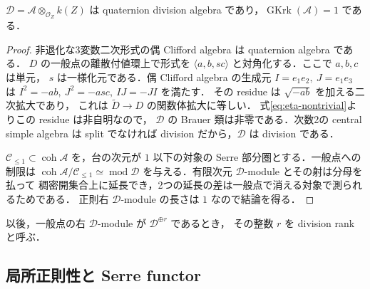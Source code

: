 \begin{proposition}
\label{prop:division}
$\mathscr D=\mathcal A\otimes_{\mathcal O_Z}k(Z)$ は quaternion division algebra
であり，$\operatorname{GKrk}(\mathcal A)=1$ である．
\end{proposition}
\begin{proof}
非退化な3変数二次形式の偶 Clifford algebra は quaternion algebra である．
$D$ の一般点の離散付値環上で形式を
$\langle a,b,sc\rangle$ と対角化する．ここで $a,b,c$ は単元，
$s$ は一様化元である．偶 Clifford algebra の生成元
$I=e_1e_2,\ J=e_1e_3$ は
$I^2=-ab,\ J^2=-asc,\ IJ=-JI$ を満たす．
その residue は $\sqrt{-ab}$ を加える二次拡大であり，
これは $\widetilde D\to D$ の関数体拡大に等しい．
式\eqref{eq:eta-nontrivial}よりこの residue は非自明なので，
$\mathscr D$ の Brauer 類は非零である．次数2の central simple algebra
は split でなければ division だから，$\mathscr D$ は division である．

$\mathcal C_{\le1}\subset\operatorname{coh}\mathcal A$ を，台の次元が $1$ 以下の対象の
Serre 部分圏とする．一般点への制限は
$\operatorname{coh}\mathcal A/\mathcal C_{\le1}\simeq\operatorname{mod}\mathscr D$
を与える．有限次元 $\mathscr D$-module とその射は分母を払って
稠密開集合上に延長でき，2つの延長の差は一般点で消える対象で測られるためである．
正則右 $\mathscr D$-module の長さは $1$ なので結論を得る．
\end{proof}

以後，一般点の右 $\mathscr D$-module が $\mathscr D^{\oplus r}$ であるとき，
その整数 $r$ を division rank と呼ぶ．

\subsection{局所正則性と Serre functor}

